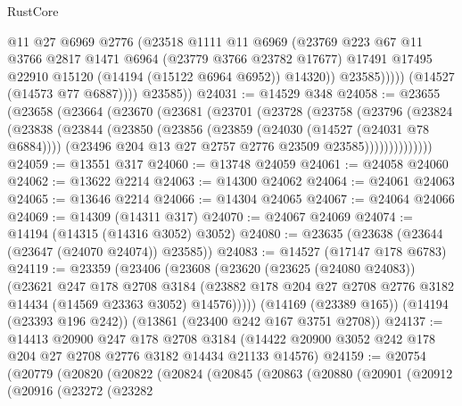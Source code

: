 \begin{lexlean}{RustCore}
\begin{coremodule}
                      @11
                      @27
                      @6969
                      @2776
                      (@23518
                        @1111
                        @11
                        @6969
                        (@23769
                          @223
                          @67
                          @11
                          @3766
                          @2817
                          @1471
                          @6964
                          (@23779 @3766 @23782 @17677)
                          @17491
                          @17495
                          @22910
                          @15120
                          (@14194 (@15122 @6964 @6952))
                          @14320))
                      @23585)))))
            (@14527 (@14573 @77 @6887))))
        @23585))
@24031 := @14529 @348
@24058 := @23655
    (@23658
      (@23664
        (@23670
          (@23681
            (@23701
              (@23728
                (@23758
                  (@23796
                    (@23824
                      (@23838
                        (@23844
                          (@23850
                            (@23856
                              (@23859 (@24030 (@14527 (@24031 @78 @6884))))
                              (@23496 @204 @13 @27 @2757 @2776 @23509 @23585))))))))))))))
@24059 := @13551 @317
@24060 := @13748 @24059
@24061 := @24058 @24060
@24062 := @13622 @2214
@24063 := @14300 @24062
@24064 := @24061 @24063
@24065 := @13646 @2214
@24066 := @14304 @24065
@24067 := @24064 @24066
@24069 := @14309 (@14311 @317)
@24070 := @24067 @24069
@24074 := @14194 (@14315 (@14316 @3052) @3052)
@24080 := @23635 (@23638 (@23644 (@23647 (@24070 @24074)) @23585))
@24083 := @14527 (@17147 @178 @6783)
@24119 := @23359
    (@23406
      (@23608
        (@23620
          (@23625 (@24080 @24083))
          (@23621
            @247
            @178
            @2708
            @3184
            (@23882 @178 @204 @27 @2708 @2776 @3182 @14434 (@14569 @23363 @3052) @14576)))))
    (@14169 (@23389 @165))
    (@14194 (@23393 @196 @242))
    (@13861 (@23400 @242 @167 @3751 @2708))
@24137 := @14413
    @20900
    @247
    @178
    @2708
    @3184
    (@14422 @20900 @3052 @242 @178 @204 @27 @2708 @2776 @3182 @14434 @21133 @14576)
@24159 := @20754
    (@20779
      (@20820
        (@20822
          (@20824
            (@20845
              (@20863
                (@20880
                  (@20901
                    (@20912
                      (@20916
                        (@23272
                          (@23282

\end{coremodule}
\end{lexlean}
